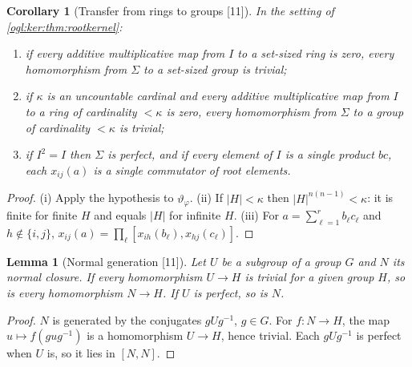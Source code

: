 \documentclass[11pt,oneside]{article}
\numberwithin{equation}{section}
\newtheorem{lemma}[lemma]{Lemma}
\newtheorem{corollary}[corollary]{Corollary}
\theoremstyle{definition}
\theoremstyle{remark}
\newcommand{\src}[1]{\textup{\textsf{\small[#1]}}}
\begin{document}
\begin{corollary}[Transfer from rings to groups \src{11}]\label{ogl:ker:cor:transfer}
In the setting of \cref{ogl:ker:thm:rootkernel}:
\begin{enumerate}
\item if every additive multiplicative map from $I$ to a set-sized ring is
zero, every homomorphism from $\Sigma$ to a set-sized group is trivial;
\item if $\kappa$ is an uncountable cardinal and every additive multiplicative
map from $I$ to a ring of cardinality $<\kappa$ is zero, every homomorphism
from $\Sigma$ to a group of cardinality $<\kappa$ is trivial;
\item if $I^2=I$ then $\Sigma$ is perfect, and if every element of $I$ is a
single product $bc$, each $x_{ij}(a)$ is a single commutator of root elements.
\end{enumerate}
\end{corollary}
\begin{proof}
(i) Apply the hypothesis to $\vartheta_\varphi$. (ii) If $|H|<\kappa$ then
$|H|^{n(n-1)}<\kappa$: it is finite for finite $H$ and equals $|H|$ for
infinite $H$. (iii) For $a=\sum_{\ell=1}^rb_\ell c_\ell$ and $h\notin\{i,j\}$,
$x_{ij}(a)=\prod_\ell[x_{ih}(b_\ell),x_{hj}(c_\ell)]$.
\end{proof}

\begin{lemma}[Normal generation \src{11}]\label{ogl:ker:lem:closure}
Let $U$ be a subgroup of a group $G$ and $N$ its normal closure. If every
homomorphism $U\to H$ is trivial for a given group $H$, so is every
homomorphism $N\to H$. If $U$ is perfect, so is $N$.
\end{lemma}
\begin{proof}
$N$ is generated by the conjugates $gUg^{-1}$, $g\in G$. For $f:N\to H$, the map
$u\mapsto f(gug^{-1})$ is a homomorphism $U\to H$, hence trivial. Each
$gUg^{-1}$ is perfect when $U$ is, so it lies in $[N,N]$.
\end{proof}
\end{document}
